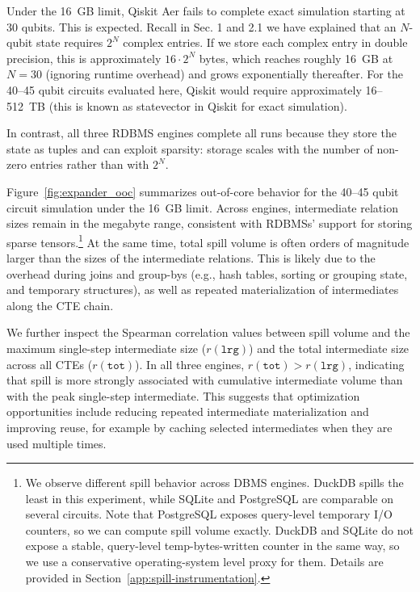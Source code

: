 Under the 16~GB limit, Qiskit Aer fails to complete exact simulation starting at 30 qubits.
This is expected. Recall in Sec. 1 and 2.1 we have explained that 
an $N$-qubit state requires $2^N$
complex entries. If we store each complex entry in double precision, this is approximately $16 \cdot 2^N$ bytes,
which reaches roughly 16~GB at $N{=}30$ (ignoring runtime overhead) and grows
exponentially thereafter. For the 40--45 qubit circuits evaluated here, Qiskit would require approximately 16--512~TB (this is known as
statevector in Qiskit for exact simulation). 

In contrast, all three RDBMS engines
complete all runs because they store the state as tuples and can exploit sparsity: storage
scales with the number of non-zero entries rather than with $2^N$.



Figure~\ref{fig:expander_ooc} summarizes out-of-core behavior for the 40--45 qubit circuit simulation under the 16~GB limit.
Across engines, intermediate relation sizes remain in the megabyte range, consistent with RDBMSs' support for storing sparse tensors.\footnote{We observe different spill behavior across DBMS
engines. DuckDB spills the least in this experiment, while SQLite and PostgreSQL are
comparable on several circuits. Note that PostgreSQL exposes query-level temporary I/O
counters, so we can compute spill volume exactly. DuckDB and SQLite do not expose a
stable, query-level temp-bytes-written counter in the same way, so we use a conservative
operating-system level proxy for them. Details are provided in
Section~\ref{app:spill-instrumentation}.}
At the same time, total spill volume is often orders of magnitude larger than the sizes of the
intermediate relations. This is likely due to the overhead during joins and
group-bys (e.g., hash tables, sorting or grouping state, and temporary structures), as
well as repeated materialization of intermediates along the CTE chain.




We further inspect the Spearman correlation values between spill volume and the maximum
single-step intermediate size ($r(\texttt{lrg})$) and the total intermediate size across
all CTEs ($r(\texttt{tot})$). In all three engines, $r(\texttt{tot}) > r(\texttt{lrg})$,
indicating that spill is more strongly associated with cumulative intermediate volume than
with the peak single-step intermediate. This suggests that optimization opportunities
include reducing repeated intermediate materialization and improving reuse, for example by
caching selected intermediates when they are used multiple times.

